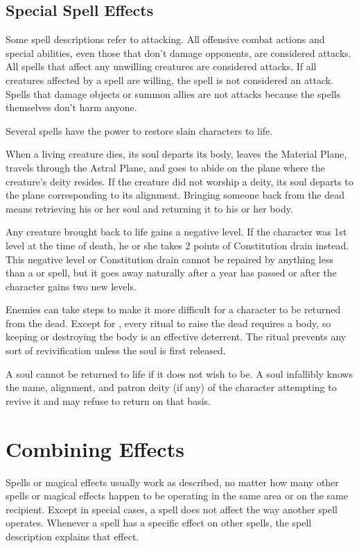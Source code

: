 \subsection{Special Spell Effects}

 Some spell descriptions refer to attacking. All offensive combat actions and special abilities, even those that don't damage opponents, are considered attacks. All spells that affect any unwilling creatures are considered attacks. If all creatures affected by a spell are willing, the spell is not considered an attack. Spells that damage objects or summon allies are not attacks because the spells themselves don't harm anyone.

\label{Bringing Back the Dead}
 Several spells have the power to restore slain characters to life.

When a living creature dies, its soul departs its body, leaves the Material Plane, travels through the Astral Plane, and goes to abide on the plane where the creature's deity resides. If the creature did not worship a deity, its soul departs to the plane corresponding to its alignment. Bringing someone back from the dead means retrieving his or her soul and returning it to his or her body.

 Any creature brought back to life gains a negative level. If the character was 1st level at the time of death, he or she takes 2 points of Constitution drain instead. This negative level or Constitution drain cannot be repaired by anything less than a  or  spell, but it goes away naturally after a year has passed or after the character gains two new levels.

 Enemies can take steps to make it more difficult for a character to be returned from the dead. Except for , every ritual to raise the dead requires a body, so keeping or destroying the body is an effective deterrent. The  ritual prevents any sort of revivification unless the soul is first released.

 A soul cannot be returned to life if it does not wish to be. A soul infallibly knows the name, alignment, and patron deity (if any) of the character attempting to revive it and may refuse to return on that basis.

\section{Combining Effects}
Spells or magical effects usually work as described, no matter how many other spells or magical effects happen to be operating in the same area or on the same recipient. Except in special cases, a spell does not affect the way another spell operates. Whenever a spell has a specific effect on other spells, the spell description explains that effect.

